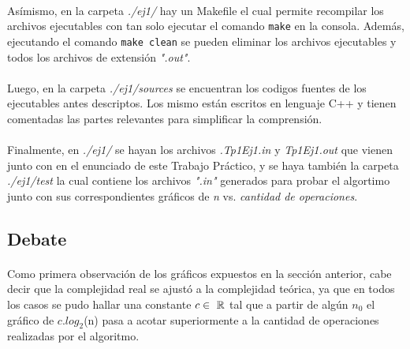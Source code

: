 {\paragraph{}
Asímismo, en la carpeta \textit{./ej1/} hay un Makefile el cual permite recompilar los archivos ejecutables con tan solo ejecutar el comando \texttt{make} en la consola. Además, ejecutando el comando \texttt{make clean} se pueden eliminar los archivos ejecutables y todos los archivos de extensión \textit{".out"}.

\paragraph{}
Luego, en la carpeta \textit{./ej1/sources} se encuentran los codigos fuentes de los ejecutables antes descriptos. Los mismo están escritos en lenguaje C++ y tienen comentadas las partes relevantes para simplificar la comprensión.

\paragraph{}
Finalmente, en \textit{./ej1/} se hayan los archivos \textit{.Tp1Ej1.in} y \textit{Tp1Ej1.out} que vienen junto con en el enunciado de este Trabajo Práctico, y se haya también la carpeta \textit{./ej1/test} la cual contiene los archivos \textit{".in"} generados para probar el algortimo junto con sus correspondientes gráficos de \textit{n} vs. \textit{cantidad de operaciones}.


\subsection{Debate}
\label{Debate1}

\paragraph{}
Como primera observación de los gráficos expuestos en la sección anterior, cabe decir que la complejidad real se ajustó a la complejidad teórica, ya que en todos los casos se pudo hallar una constante $c \in\ \mathbb{R}$ tal que a partir de algún $n_0$ el gráfico de $c.log_2$(n) pasa a acotar superiormente a la cantidad de operaciones realizadas por el algoritmo.

}
